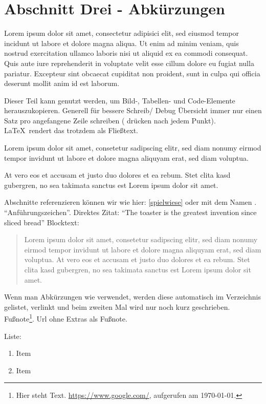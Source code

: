 \section[Kurztitel 3]{Abschnitt Drei - Abkürzungen}
Lorem  ipsum dolor sit amet, consectetur adipisici elit, sed eiusmod  tempor incidunt ut labore et dolore magna aliqua. Ut enim ad minim veniam, quis nostrud exercitation ullamco laboris nisi ut aliquid ex ea commodi consequat. Quis aute iure reprehenderit in voluptate velit esse cillum dolore eu fugiat nulla pariatur. Excepteur sint obcaecat cupiditat non proident,  sunt in culpa qui officia deserunt mollit anim id est laborum. 


Dieser Teil kann genutzt werden, um Bild-, Tabellen- und Code-Elemente herauszukopieren.
Generell für bessere Schreib/ Debug Übersicht immer nur einen Satz pro angefangene Zeile schreiben ( drücken nach jedem Punkt).
\LaTeX~rendert das trotzdem als Fließtext. 

\vspace{3cm}

Lorem ipsum dolor sit amet, consetetur sadipscing elitr, sed diam nonumy eirmod tempor invidunt ut labore et dolore magna aliquyam erat, sed diam voluptua. 

At vero eos et accusam et justo duo dolores et ea rebum. Stet clita kasd gubergren, no sea takimata sanctus est Lorem ipsum dolor sit amet.


Abschnitte referenzieren können wir wie hier: \autoref{spielwiese} oder mit dem Namen .
\enquote{Anführungszeichen}.
Direktes Zitat: \enquote{The toaster is the greatest invention since sliced bread} %
Blocktext:

\blockquote{
Lorem ipsum dolor sit amet, consetetur sadipscing elitr, sed diam nonumy eirmod tempor invidunt ut labore et dolore magna aliquyam erat, sed diam voluptua.
At vero eos et accusam et justo duo dolores et ea rebum. Stet clita kasd gubergren, no sea takimata sanctus est Lorem ipsum dolor sit amet.
}

Wenn man Abkürzungen wie verwendet, werden diese automatisch im Verzeichnis gelistet, verlinkt und beim zweiten Mal wird nur noch kurz geschrieben. 
Fußnote\footnote{Hier steht Text. \url{https://www.google.com/}, aufgerufen am \today.}.
Url ohne Extras als Fußnote.

Liste:
\begin{enumerate}
    \item Item
    \item Item
\end{enumerate}

